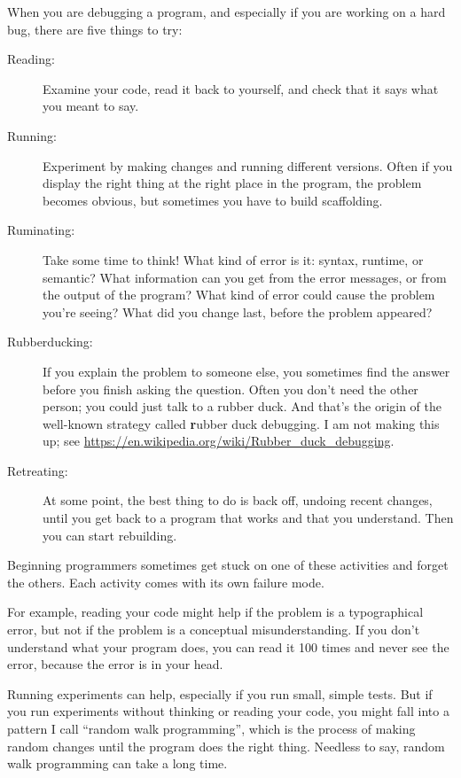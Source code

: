 \documentclass[
DIV=11,
fontsize=13,
twoside,
headinclude=false,
titlepage=firstiscover,
abstract=true,
headsepline=true,
footsepline=true,
chapterprefix=true, %
headings=big,
bibliography=totoc,%
captions=tableheading
]{scrbook}
\theoremstyle{definition}
\begin{document}
When you are debugging a program, and especially if you are
working on a hard bug, there are five things to try:

\begin{description}

\item[Reading:] Examine your code, read it back to yourself, and
check that it says what you meant to say.

\item[Running:] Experiment by making changes and running different
versions.  Often if you display the right thing at the right place
in the program, the problem becomes obvious, but sometimes you have to
build scaffolding.

\item[Ruminating:] Take some time to think!  What kind of error
is it: syntax, runtime, or semantic?  What information can you get from
the error messages, or from the output of the program?  What kind of
error could cause the problem you're seeing?  What did you change
last, before the problem appeared?

\item[Rubberducking:] If you explain the problem to someone else, you
  sometimes find the answer before you finish asking the question.
  Often you don't need the other person; you could just talk to a rubber
  duck.  And that's the origin of the well-known strategy called {\textbf
    rubber duck debugging}.  I am not making this up; see
  \url{https://en.wikipedia.org/wiki/Rubber_duck_debugging}.

\item[Retreating:] At some point, the best thing to do is back
off, undoing recent changes, until you get back to a program that
works and that you understand.  Then you can start rebuilding.

\end{description}

Beginning programmers sometimes get stuck on one of these activities
and forget the others.  Each activity comes with its own failure
mode.

For example, reading your code might help if the problem is a
typographical error, but not if the problem is a conceptual
misunderstanding.  If you don't understand what your program does, you
can read it 100 times and never see the error, because the error is in
your head.

Running experiments can help, especially if you run small, simple
tests.  But if you run experiments without thinking or reading your
code, you might fall into a pattern I call ``random walk programming'',
which is the process of making random changes until the program
does the right thing.  Needless to say, random walk programming
can take a long time.
\end{document}
